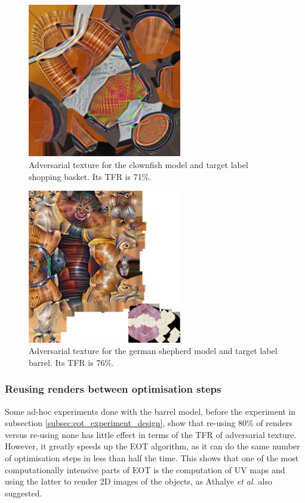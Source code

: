 \begin{figure}[H]
    \centering
    \includegraphics[width=0.6\textwidth]{graphics/clownfish_790_adv_9999.jpg}
    \caption{Adversarial texture for the clownfish model and target label shopping basket. Its TFR is 71\%.}
    \label{fig:clownfish_noisy_texture}
\end{figure}

\begin{figure}[H]
    \centering
    \includegraphics[width=0.6\textwidth]{graphics/german_shepherd_427_adv_9999.jpg}
    \caption{Adversarial texture for the german shepherd model and target label barrel. Its TFR is 76\%.}
    \label{fig:dog_noisy_texture}
\end{figure}

\subsubsection{Reusing renders between optimisation steps}

Some ad-hoc experiments done with the barrel model, before the experiment in subsection \ref{subsec:eot_experiment_design}, show that re-using 80\% of renders versus re-using none has little effect in terms of the TFR of adversarial texture. However, it greatly speeds up the EOT algorithm, as it can do the same number of optimisation steps in less than half the time. This shows that one of the most computationally intensive parts of EOT is the computation of UV maps and using the latter to render 2D images of the objects, as Athalye \textit{et al.} \cite{athalye} also suggested.

